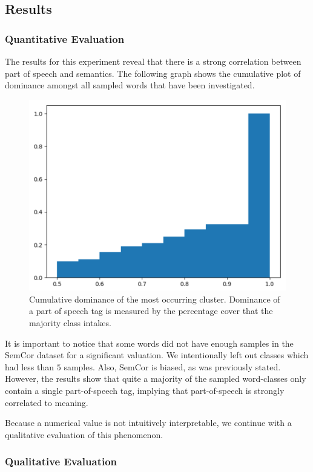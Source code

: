 \documentclass[a4paper,12pt,twoside,openright]{report}
\begin{document}
\subsection{Results}

\subsubsection{Quantitative Evaluation}

The results for this experiment reveal that there is a strong correlation between part of speech and semantics.
The following graph shows the cumulative plot of dominance amongst all sampled words that have been investigated.

\begin{figure}[H]
	\center
  \includegraphics[width=0.5\linewidth]{./assets/experiments/pos_dominance_calculation.png}
  \caption{Cumulative dominance of the most occurring cluster. Dominance of a part of speech tag is measured by the percentage cover that the majority class intakes.}
  \label{fig:BERT_vanilla_pipeline}
\end{figure}

It is important to notice that some words did not have enough samples in the SemCor dataset for a significant valuation. 
We intentionally left out classes which had less than $5$ samples.
Also, SemCor is biased, as was previously stated.
However, the results show that quite a majority of the sampled word-classes only contain a single part-of-speech tag, implying that part-of-speech is strongly correlated to meaning.

Because a numerical value is not intuitively interpretable, we continue with a qualitative evaluation of this phenomenon.

\subsubsection{Qualitative Evaluation}
\end{document}
